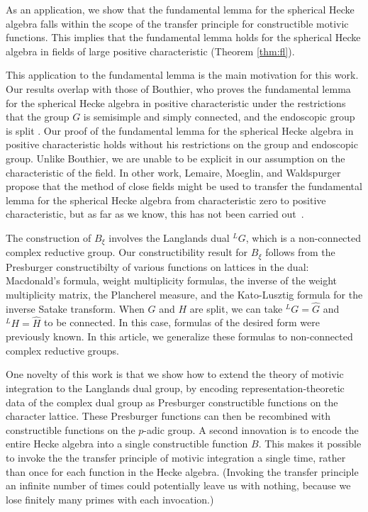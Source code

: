 As an application, we show that the fundamental lemma for the spherical Hecke algebra falls within
the scope of the transfer principle for constructible motivic functions.
This implies that the fundamental lemma holds for the spherical Hecke algebra in fields of large positive
characteristic (Theorem \ref{thm:fl}).

This application to the fundamental lemma is the main motivation for this work.  Our results overlap with
those of Bouthier, who proves the fundamental lemma for the spherical Hecke algebra in positive
characteristic under the restrictions that the group $G$ is semisimple and simply connected, 
and the endoscopic group is split \cite[Theorem~0.2]{bouthier}.  Our proof of the fundamental lemma for the
spherical Hecke algebra in positive characteristic holds without his restrictions on the group and endoscopic group.
Unlike Bouthier, we are unable to be explicit in our assumption
on the characteristic of the field.  In other work,
Lemaire, Moeglin, and Waldspurger propose that the method of close fields might be used to transfer the
fundamental lemma for the spherical Hecke algebra from characteristic zero to positive characteristic, but as far as we know, 
this has not been
carried out~\cite[\S1.3]{LMW}.

The construction of $B_\xi$ involves the Langlands dual ${}^LG$, which is a non-connected complex reductive group.
Our constructibility result for $B_\xi$ follows from the  Presburger constructibilty of various
functions on lattices in the dual:  Macdonald's formula, weight multiplicity formulas, the inverse of the weight multiplicity matrix,
the Plancherel measure,
and the Kato-Lusztig formula for the inverse Satake transform.  
When $G$ and $H$ are split, we can take ${}^LG = \hat G$ and ${}^LH=\hat H$ to be connected.  In this case,
formulas of the desired form were previously known.  In this article, we
generalize these formulas to non-connected complex reductive groups.


One novelty of this work is that we show how to extend the theory of motivic integration to the Langlands
dual group, by encoding representation-theoretic data of the complex dual group as Presburger constructible functions on the character lattice. These
Presburger functions can then be recombined with constructible functions on the $p$-adic group.  A second innovation is
to encode the entire Hecke algebra into a single constructible function $B$.  This makes it possible to invoke the the transfer
principle of motivic integration a single time, rather than once for each function in the Hecke algebra.  (Invoking the transfer principle
an infinite number of times could potentially leave us with nothing, because we lose finitely many primes with each invocation.)

